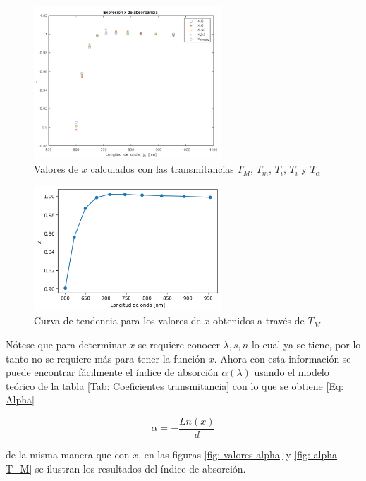 \documentclass[article]{article}
\begin{document}
\begin{multicols}{2}
        \begin{figure}[H]
        \centering
        \includegraphics[width=7cm]{valores-x.png}
        \caption{Valores de $x$ calculados con las transmitancias $T_M$, $T_m$, $T_i$, $T_i$ y $T_{\alpha}$}
        \label{fig: x-general}
        \end{figure}
        
        \begin{figure}[H]
        \centering
        \includegraphics[width=7cm]{x T_M.png}
        \caption{Curva de tendencia para los valores de $x$ obtenidos a través de $T_M$}
        \label{fig: x T_M}
        \end{figure}
        
        Nótese que para determinar $x$ se requiere conocer $\lambda,s,n$ lo cual ya se tiene, por lo tanto no se requiere más para tener la función $x$. Ahora con esta información se puede encontrar fácilmente el índice de absorción $\alpha(\lambda)$ usando el modelo teórico de la tabla \ref{Tab: Coeficientes transmitancia} con lo que se obtiene \ref{Eq: Alpha}
        
        \begin{equation}
            \alpha=-\frac{Ln(x)}{d}
            \label{Eq: Alpha}
        \end{equation}
        
        de la misma manera que con $x$, en las figuras \ref{fig: valores alpha} y \ref{fig: alpha T_M} se ilustran los resultados del índice de absorción. 
        

\end{multicols}
\end{document}
